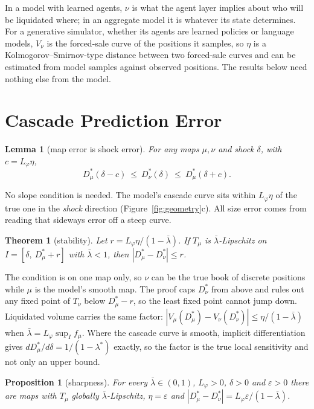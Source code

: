\documentclass[letterpaper]{article} %
\newtheorem{theorem}{Theorem}
\newtheorem{lemma}{Lemma}
\newtheorem{proposition}{Proposition}
\theoremstyle{remark}
\newcommand{\Dstar}[1]{D^{\ast}_{#1}}
\newcommand{\Lp}{L_\varphi}
\newcommand{\lb}{\bar\lambda}
\begin{document}
In a model with learned agents, $\nu$ is what the agent layer implies about who will be liquidated where; in an aggregate model it is whatever its state determines. For a generative simulator, whether its agents are learned policies or language models, $V_\nu$ is the forced-sale curve of the positions it samples, so $\eta$ is a Kolmogorov--Smirnov-type distance between two forced-sale curves and can be estimated from model samples against observed positions. The results below need nothing else from the model.

\section{Cascade Prediction Error}

\begin{lemma}[map error is shock error]\label{lem:shock}
For any maps $\mu,\nu$ and shock $\delta$, with $c=\Lp\eta$,
\[
\Dstar{\mu}(\delta-c)\ \le\ \Dstar{\nu}(\delta)\ \le\ \Dstar{\mu}(\delta+c).
\]
\end{lemma}

No slope condition is needed. The model's cascade curve sits within $\Lp\eta$ of the true one in the \emph{shock} direction (Figure~\ref{fig:geometry}c). All size error comes from reading that sideways error off a steep curve.

\begin{theorem}[stability]\label{thm:stability}
Let $r=\Lp\eta/(1-\lb)$. If $T_\mu$ is $\lb$-Lipschitz on $I=[\delta,\ \Dstar{\mu}+r]$ with $\lb<1$, then $|\Dstar{\mu}-\Dstar{\nu}|\le r$.
\end{theorem}

The condition is on one map only, so $\nu$ can be the true book of discrete positions while $\mu$ is the model's smooth map. The proof caps $\Dstar{\nu}$ from above and rules out any fixed point of $T_\nu$ below $\Dstar{\mu}-r$, so the least fixed point cannot jump down. Liquidated volume carries the same factor: $|V_\mu(\Dstar{\mu})-V_\nu(\Dstar{\nu})|\le\eta/(1-\lb)$ when $\lb=\Lp\sup_I f_\mu$. Where the cascade curve is smooth, implicit differentiation gives $d\Dstar{\mu}/d\delta=1/(1-\lambda^\ast)$ exactly, so the factor is the true local sensitivity and not only an upper bound.

\begin{proposition}[sharpness]\label{prop:sharp}
For every $\lb\in(0,1)$, $\Lp>0$, $\delta>0$ and $\varepsilon>0$ there are maps with $T_\mu$ globally $\lb$-Lipschitz, $\eta=\varepsilon$ and $|\Dstar{\mu}-\Dstar{\nu}|=\Lp\varepsilon/(1-\lb)$.
\end{proposition}
\end{document}
